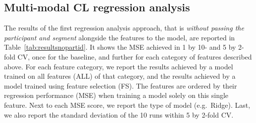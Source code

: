 \documentclass[output=paper]{langsci/langscibook}
\begin{document}


%

\subsection{Multi-modal CL regression analysis}\largerpage
The results of the first regression analysis approach, that is \textit{without passing the participant and segment} alongside the features to the model, are reported in Table~\ref{tab:resultsnopartid}.
It shows the MSE achieved in 1 by 10- and 5 by 2-fold CV, once for the baseline, and further for each category of features described above. For each feature category, we report the results achieved by a model trained on all features (ALL) of that category, and the results achieved by a model trained using feature selection (FS). The features are ordered by their regression performance (MSE) when training a model solely on this single feature. %
Next to each MSE score, we report the type of model (e.g.\ Ridge). Last, we also report the standard deviation of the 10 runs within 5 by 2-fold CV.
\end{document}

